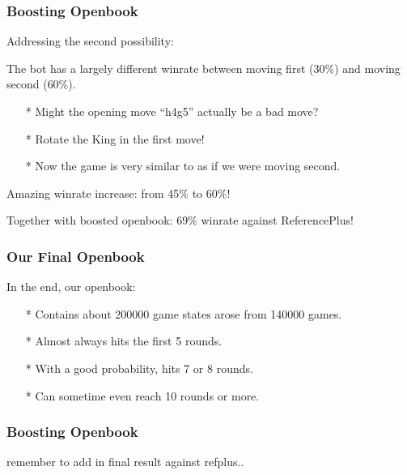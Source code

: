 \documentclass[10pt]{beamer}
\begin{document}
	\begin{frame}
		\frametitle{Boosting Openbook}
		
		Addressing the second possibility:\pause
		
		The bot has a largely different winrate between moving first (\textcolor{dred}{30\%}) and moving second (\textcolor{fgreen}{60\%}).\pause
		
		\begin{itemize}
		\item[*] Might the opening move ``h4g5'' actually be a bad move?\pause
		\item[*] Rotate the King in the first move!\pause
		\item[*] Now the game is very similar to as if we were moving second.\pause
		\end{itemize}
		
		Amazing winrate increase: from \textcolor{dred}{45\%} to \textcolor{fgreen}{60\%}!\pause
		
		Together with boosted openbook: \textcolor{fgreen}{69\%} winrate against ReferencePlus!
	\end{frame}
	
	\begin{frame}
		\frametitle{Our Final Openbook}
		
		In the end, our openbook:\pause
		\begin{itemize}
		\item[*] Contains about \textcolor{fgreen}{200000} game states arose from \textcolor{fgreen}{140000} games.\pause
		\item[*] Almost always hits the first \textcolor{fgreen}{5} rounds.\pause
		\item[*] With a good probability, hits \textcolor{fgreen}{7} or \textcolor{fgreen}{8} rounds.\pause
		\item[*] Can sometime even reach \textcolor{fgreen}{10} rounds or more.
		\end{itemize}
	\end{frame}
	
	\begin{frame}
		\frametitle{Boosting Openbook}
		
		remember to add in final result against refplus..
	\end{frame}
	
	
	
		
\end{document}
